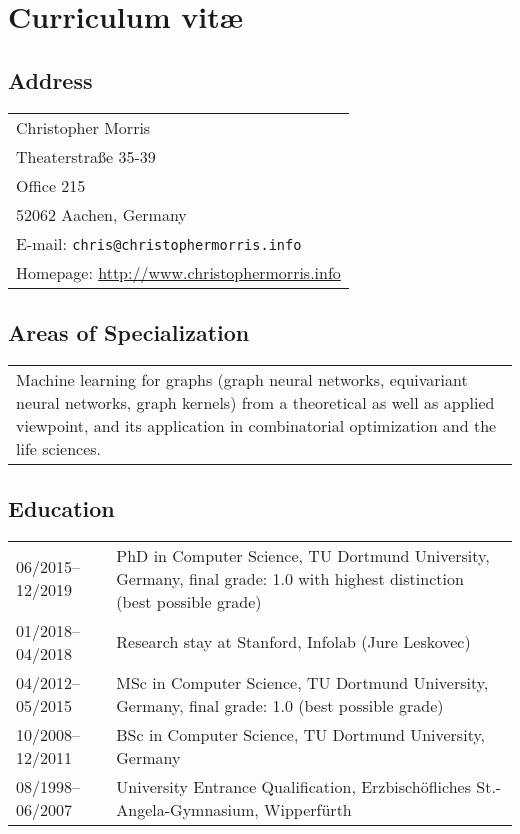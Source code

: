 \documentclass[11pt, a4paper, DIV=12]{scrartcl}
\begin{document}
\section*{\textcolor{upmaroon}{Curriculum vitæ}}
\vspace{-20pt}
\hrulefill
\subsection*{Address}
\noindent
\begin{tabular}{l}
Christopher Morris\\
Theaterstraße 35-39\\ 
Office 215\\ 
52062 Aachen, Germany\\
E-mail: \texttt{chris@christophermorris.info} \\
Homepage: \url{http://www.christophermorris.info}\\
\end{tabular}

\subsection*{Areas of Specialization}
\noindent
\begin{tabular}{p{15.0cm}}
Machine learning for graphs (graph neural networks, equivariant neural networks, graph kernels) from a theoretical as well as applied viewpoint, and its application in combinatorial optimization and the life sciences. 
\end{tabular}

\subsection*{Education}
\noindent
\begin{tabular}{p{3.0cm}p{11.5cm}}
	06/2015--12/2019&PhD in Computer Science, TU Dortmund University, Germany, final grade: 1.0 with highest distinction  (best possible grade)\\
	01/2018--04/2018& Research stay at Stanford, Infolab (Jure Leskovec)\\
	04/2012--05/2015&MSc in Computer Science, TU Dortmund University, Germany, final grade: 1.0 (best possible grade)\\
	10/2008--12/2011&BSc in Computer Science, TU Dortmund University, Germany\\
	08/1998--06/2007&University Entrance Qualification, Erzbisch\"ofliches St.-Angela-Gymnasium, Wipperf\"urth\\
\end{tabular}
\end{document}
